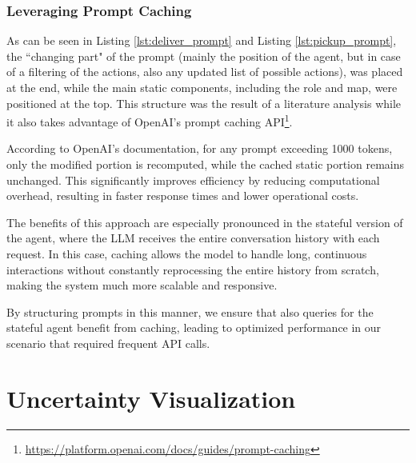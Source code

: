 \subsubsection{Leveraging Prompt Caching}
As can be seen in Listing \ref{lst:deliver_prompt} and Listing \ref{lst:pickup_prompt},
the ``changing part" of the prompt (mainly the position of the agent, but in case
of a filtering of the actions, also any updated list of possible actions), was
placed at the end, while the main static components, including the role and map,
were positioned at the top. This structure was the result of a literature
analysis while it also takes advantage of OpenAI's prompt caching API\footnote{\url{https://platform.openai.com/docs/guides/prompt-caching}}.

According to OpenAI's documentation, for any prompt exceeding 1000 tokens, only the
modified portion is recomputed, while the cached static portion remains
unchanged. This significantly improves efficiency by reducing computational overhead,
resulting in faster response times and lower operational costs.

The benefits of this approach are especially pronounced in the stateful version
of the agent, where the LLM receives the entire conversation history with each request.
In this case, caching allows the model to handle long, continuous interactions
without constantly reprocessing the entire history from scratch, making the system
much more scalable and responsive.

By structuring prompts in this manner, we ensure that also queries for the
stateful agent benefit from caching, leading to optimized performance in our scenario
that required frequent API calls.

\section{Uncertainty Visualization}
\label{sec:uncertainty_visualization}

